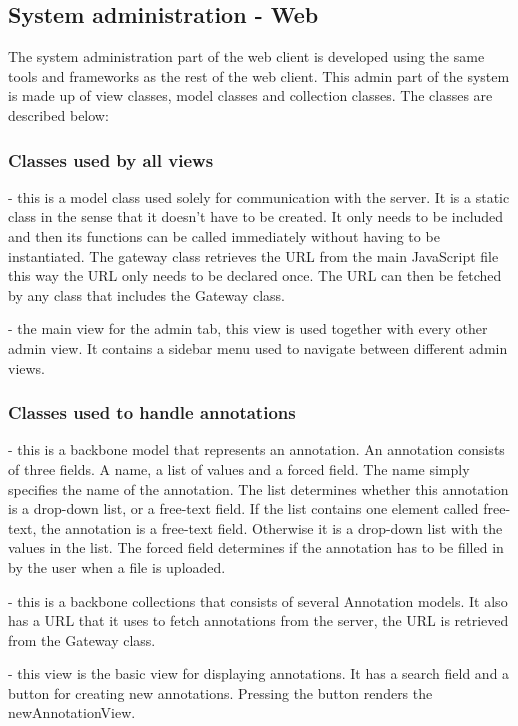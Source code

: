 \subsection{System administration - Web}
The system administration part of the web client is developed using the same tools and frameworks as the rest of the web client.
This admin part of the system is made up of view classes, model classes and collection classes. The classes are described below:

\subsubsection*{Classes used by all views}

 - this is a model class used solely for communication with the server. It is a static class in the sense that it doesn't have to be created. It only needs to be included and then its functions can be called immediately without having to be instantiated. The gateway class retrieves the URL from the main JavaScript file this way the URL only needs to be declared once. The URL can then be fetched by any class that includes the Gateway class.

 - the main view for the admin tab, this view is used together with every other admin view. It contains a sidebar menu used to navigate between different admin views.

\subsubsection*{Classes used to handle annotations}

 - this is a backbone model that represents an annotation. An annotation consists of three fields. A name, a list of values and a forced field. The name simply specifies the name of the annotation. The list determines whether this annotation is a drop-down list, or a free-text field. If the list contains one element called free-text, the annotation is a free-text field. Otherwise it is a drop-down list with the values in the list. The forced field determines if
the annotation has to be filled in by the user when a file is uploaded.

 - this is a backbone collections that consists of several Annotation models. It also has a URL that it uses to fetch annotations from the server, the URL is retrieved from the Gateway class. 

 - this view is the basic view for displaying annotations. It has a search field and a button for creating new annotations. Pressing the button renders the newAnnotationView. 

